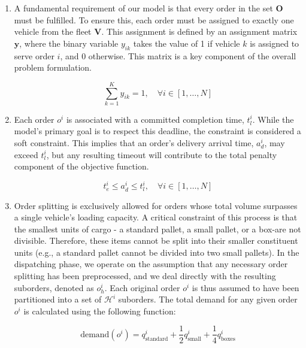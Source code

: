 \documentclass[pdflatex]{sn-jnl}
\begin{document}
\begin{enumerate}
    \item A fundamental requirement of our model is that every order in the set $\textbf{O}$ must be fulfilled. To ensure this, each order must be assigned to exactly one vehicle from the fleet $\textbf{V}$. This assignment is defined by an assignment matrix $\textbf{y}$, where the binary variable $y_{ik}$ takes the value of 1 if vehicle $k$ is assigned to serve order $i$, and 0 otherwise. This matrix is a key component of the overall problem formulation.

\begin{equation}
    \sum_{k=1}^K y_{ik} = 1, \quad \forall i \in [1, \dots , N]
\end{equation}
    
    \item Each order $o^i$ is associated with a committed completion time, $t_l^i$. While the model's primary goal is to respect this deadline, the constraint is considered a soft constraint. This implies that an order's delivery arrival time, $a_d^i$, may exceed $t_l^i$, but any resulting timeout will contribute to the total penalty component of the objective function. 

\begin{equation}
    t_e ^i \leq a_d^i \leq t_l^i, \quad \forall i \in [1 , \dots,  N]
\end{equation}
    
    \item Order splitting is exclusively allowed for orders whose total volume surpasses a single vehicle's loading capacity. A critical constraint of this process is that the smallest units of cargo - a standard pallet, a small pallet, or a box-are not divisible. Therefore, these items cannot be split into their smaller constituent units (e.g., a standard pallet cannot be divided into two small pallets). In the dispatching phase, we operate on the assumption that any necessary order splitting has been preprocessed, and we deal directly with the resulting suborders, denoted as $o^i_h$. Each original order $o^i$ is thus assumed to have been partitioned into a set of $\mathcal{H} ^i$ suborders. The total demand for any given order $o^i$ is calculated using the following function:

\begin{equation}
    \text{demand}(o^i) = q^i_{\text{standard}} + \frac{1}{2} q^i_{\text{small}} + \frac{1}{4} q^i_{\text{boxes}}
\end{equation}


\end{enumerate}
\end{document}
